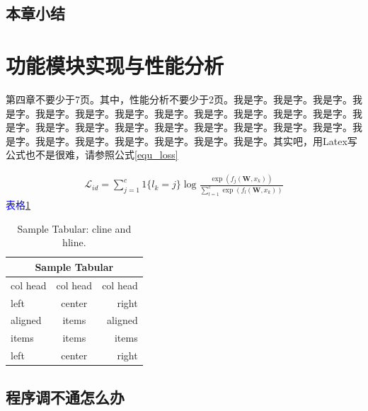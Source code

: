 \documentclass[supercite]{HustGraduPaper}
\theoremstyle{definition}
\begin{document}
\subsection{本章小结}

\newpage


\section{功能模块实现与性能分析}





第四章不要少于7页\cite{Multiplexing2000USA}。其中，性能分析不要少于2页。我是字。我是字。我是字。我是字。我是字。我是字。我是字。我是字。我是字。我是字。我是字。我是字。我是字。我是字。我是字。我是字。我是字。我是字。我是字。我是字。我是字。我是字。我是字。我是字。我是字。我是字。我是字。我是字。其实吧，用Latex写公式也不是很难，请参照公式\ref{equ_loss}

\begin{eqnarray}\label{equ_loss}
	\mathcal{L}_{id}=\sum_{j=1}^{c}1\{l_k=j\}\log\frac{\exp(f_j(\textbf{W},x_k))}{\sum\nolimits_{l=1}^{c}\exp(f_l(\textbf{W},x_k))}
\end{eqnarray}
\textcolor{blue}{表格\ref{table_eval}}
\begin{table}
	\begin{center}
		\setlength{\tabcolsep}{5.0mm}
		\caption{Sample Tabular: cline and hline.}
		\begin{tabular}{|l|c|r|}
			\hline 
			\multicolumn{3}{|c|}{Sample Tabular}\\
			\hline 
			col head & col head & col head\\
			\hline 
			left & center & right\\
			\cline{1-2}
			aligned & items & aligned\\
			\cline{2-3}
			items & items & items\\
			\cline{1-2}
			left & center & right\\
			\hline
			
		\end{tabular}\label{table_eval}
		
	\end{center}
\end{table}



\subsection{程序调不通怎么办}
\end{document}
